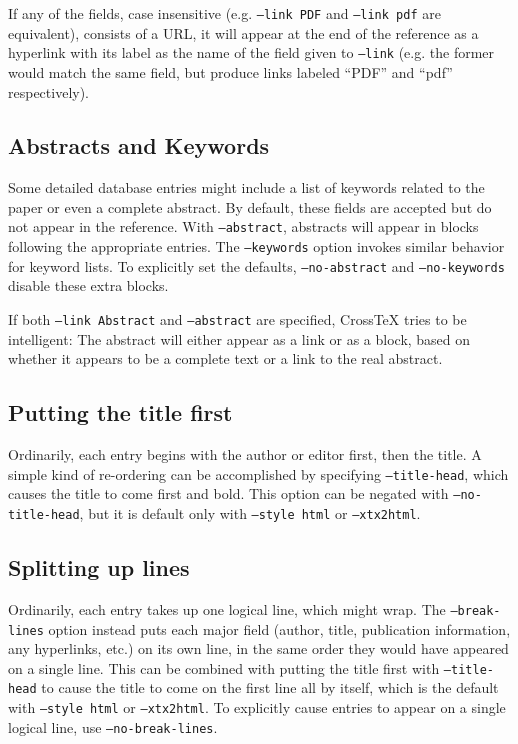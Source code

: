 \documentclass{article}
\newcommand{\XTX}{Cross\TeX}
\begin{document}
If any of the fields, case insensitive (e.g. \texttt{--link~PDF} and
\texttt{--link~pdf} are equivalent), consists of a URL, it will appear
at the end of the reference as a hyperlink with its label as the name
of the field given to \texttt{--link} (e.g. the former would match the
same field, but produce links labeled ``PDF'' and ``pdf'' respectively).

\subsection{Abstracts and Keywords}

Some detailed database entries might include a list of keywords related
to the paper or even a complete abstract.  By default, these fields are
accepted but do not appear in the reference.  With \texttt{--abstract},
abstracts will appear in blocks following the appropriate entries.
The \texttt{--keywords} option invokes similar behavior for keyword
lists.  To explicitly set the defaults, \texttt{--no-abstract} and
\texttt{--no-keywords} disable these extra blocks.

If both \texttt{--link~Abstract} and \texttt{--abstract} are specified,
\XTX{} tries to be intelligent: The abstract will either appear as a
link or as a block, based on whether it appears to be a complete text
or a link to the real abstract.

\subsection{Putting the title first}

Ordinarily, each entry begins with the author or editor first, then the
title.  A simple kind of re-ordering can be accomplished by specifying
\texttt{--title-head}, which causes the title to come first and bold.
This option can be negated with \texttt{--no-title-head}, but it is
default only with \texttt{--style~html} or \texttt{--xtx2html}.

\subsection{Splitting up lines}

Ordinarily, each entry takes up one logical line, which might wrap.
The \texttt{--break-lines} option instead puts each major field (author,
title, publication information, any hyperlinks, etc.) on its own line,
in the same order they would have appeared on a single line.  This can be
combined with putting the title first with \texttt{--title-head} to cause
the title to come on the first line all by itself, which is the default
with \texttt{--style~html} or \texttt{--xtx2html}.  To explicitly cause
entries to appear on a single logical line, use \texttt{--no-break-lines}.
\end{document}
